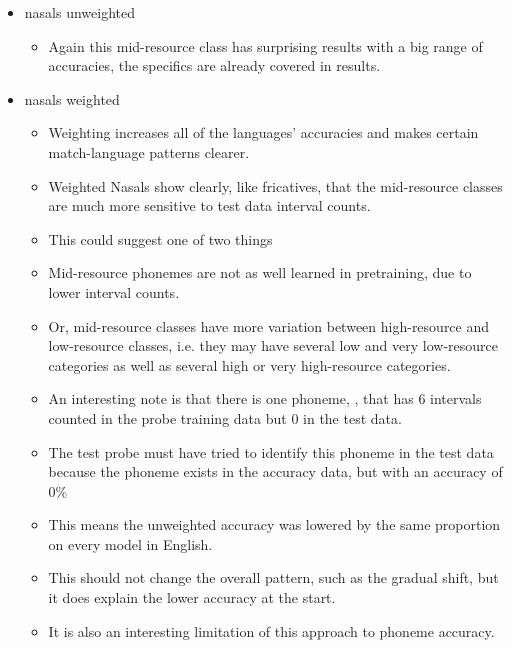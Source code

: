 \begin{itemize}
\begin{itemize}
        \item One easier step would be to check whether the low-accuracy 
        \item French fricatives also overlap a lot with English but not so much with Spanish, English has higher accuracy than Spanish so I would have to check the interval counts for both languages.
    \end{itemize}
    \item nasals unweighted
    \begin{itemize}
        \item Again this mid-resource class has surprising results with a big range of accuracies, the specifics are already covered in results.
    \end{itemize}
    \item nasals weighted
    \begin{itemize}
        \item Weighting increases all of the languages' accuracies and makes certain match-language patterns clearer.
        \item Weighted Nasals show clearly, like fricatives, that the mid-resource classes are much more sensitive to test data interval counts.
        \item This could suggest one of two things
        \item Mid-resource phonemes are not as well learned in pretraining, due to lower interval counts.
        \item Or, mid-resource classes have more variation between high-resource and low-resource classes, i.e. they may have several low and very low-resource categories as well as several high or very high-resource categories.
        
        \item An interesting note is that there is one phoneme, , that has 6 intervals counted in the probe training data but 0 in the test data.
        \item The test probe must have tried to identify this phoneme in the test data because the phoneme exists in the accuracy data, but with an accuracy of 0\%
        \item This means the unweighted accuracy was lowered by the same proportion on every model in English. 
        \item This should not change the overall pattern, such as the gradual shift, but it does explain the lower accuracy at the start.
        \item It is also an interesting limitation of this approach to phoneme accuracy.
        

\end{itemize}
\end{itemize}
